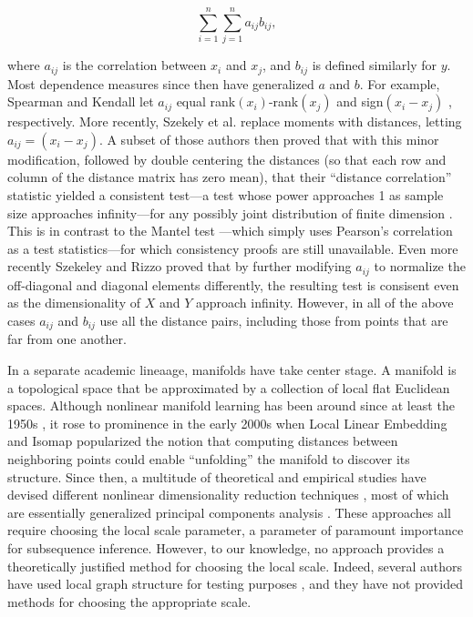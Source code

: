 \documentclass[11pt]{article}
\begin{document}
$$\sum_{i=1}^n \sum_{j=1}^n a_{ij} b_{ij}, $$

where $a_{ij}$ is the correlation between $x_i$ and $x_j$, and $b_{ij}$ is defined similarly for $y$.  Most dependence measures since then have generalized $a$ and $b$.  For example, Spearman and Kendall let $a_{ij}$ equal rank$(x_i)$-rank$(x_j)$ and sign$(x_i-x_j)$ \cite{KendallBook}, respectively.  More recently, Szekely et al. \cite{SzekelyRizzoBakirov2007} replace moments with distances, letting  $a_{ij}=(x_i-x_j)$.  A subset of those authors then proved that with this minor modification, followed by double centering the distances (so that each row and column of the distance matrix has zero mean), that their ``distance correlation'' statistic yielded a consistent test---a test whose power approaches 1 as sample size approaches infinity---for any possibly joint distribution of finite dimension \cite{SzekelyRizzo2009}. This is in contrast to the Mantel test \cite{Mantel1967}---which simply uses Pearson's correlation as a test statistics---for which consistency proofs are still unavailable.
 Even more recently Szekeley and Rizzo proved that by further modifying $a_{ij}$ to normalize the off-diagonal and diagonal elements differently, the resulting test is consisent even as the dimensionality of $X$ and $Y$ approach infinity.  However, in all of the above cases $a_{ij}$ and $b_{ij}$ use all the distance pairs, including those from points that are far from one another.

 In a separate academic lineaage, manifolds have take center stage.  A manifold is a topological space that be approximated by a collection of local flat Euclidean spaces.  Although nonlinear manifold learning has been around since at least the 1950s \cite{TorgersonBook}, it rose to prominence in the early 2000s when Local Linear Embedding \cite{Roweis200} and Isomap \cite{Tenenbaum2000} popularized the notion that computing distances between neighboring points could enable ``unfolding'' the manifold to discover its structure.  Since then, a multitude of theoretical and empirical studies have devised different nonlinear dimensionality reduction techniques \cite{LeeVerleysen2007}, most of which are essentially generalized principal components analysis \cite{ScholkopfSmolaMuller1999}.  These approaches all require choosing the local scale parameter, a parameter of paramount importance for subsequence inference.  However, to our knowledge, no approach provides a theoretically justified method for choosing the local scale. Indeed,  several authors have used local graph structure for testing purposes \cite{David1966,Friedman1983,Schilling1986,Dumcke2014}, and they have not provided methods for choosing the appropriate scale.
\end{document}
